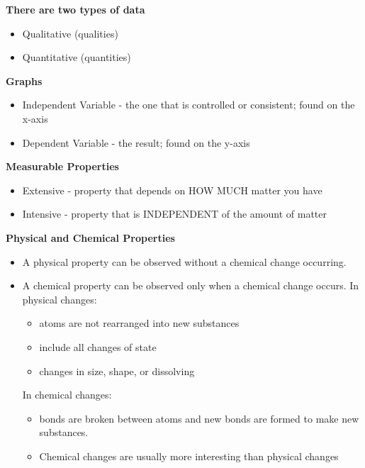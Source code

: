 \documentclass[../hchem.tex]{subfiles}
\begin{document}
\textbf{There are two types of data}
\begin{itemize}
    \item Qualitative (qualities)
    \item Quantitative (quantities)
\end{itemize}

\textbf{Graphs} 
\begin{itemize}
    \item Independent Variable - the one that is controlled or consistent; found on the x-axis 
    \item Dependent Variable - the result; found on the y-axis 
\end{itemize}

\textbf{Measurable Properties}
\begin{itemize}
    \item Extensive - property that depends on HOW MUCH matter you have 
    \item Intensive - property that is INDEPENDENT of the amount of matter 
\end{itemize}

\textbf{Physical and Chemical Properties}
\begin{itemize}
    \item A physical property can be observed without a chemical change occurring.
    \item A chemical property can be observed only when a chemical change occurs.
    In physical changes:
    \begin{itemize}
        \item atoms are not rearranged into new substances 
        \item include all changes of state 
        \item changes in size, shape, or dissolving 
    \end{itemize}

    In chemical changes:
    \begin{itemize}
        \item bonds are broken between atoms and new bonds are formed to make new substances.
        \item Chemical changes are usually more interesting than physical changes 
    \end{itemize}
\end{itemize}
\end{document}
